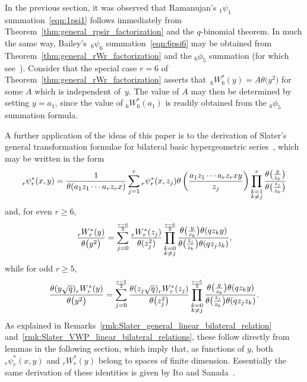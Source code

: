 \documentclass[pdftex]{sigma}
\numberwithin{equation}{section}
\begin{document}
In the previous section, it was observed that Ramanujan's $_1\psi_1$ summation~\eqref{eqn:1psi1} follows immediately from Theorem~\ref{thm:general_rpsir_factorization} and the $q$-binomial theorem. In much the same way, Bailey's~$_6\psi_6$ summation~\eqref{eqn:6psi6} may be obtained from Theorem~\ref{thm:general_rWr_factorization} and the $_6\phi_5$ summation (for which see~\cite[equation~(2.7.1)]{Gasper2004}). Consider that the special case $r=6$ of Theorem~\ref{thm:general_rWr_factorization} asserts that~${_6W_6^\ast(y) = A \theta\bigl(y^2\bigr)}$ for some $A$ which is independent of~$y$. The value of $A$ may then be determined by setting $y=a_1$, since the value of $_6W_6^\ast(a_1)$ is readily obtained from the $_6\phi_5$ summation formula.

A further application of the ideas of this paper is to the derivation of Slater's general transformation formulae for bilateral basic hypergeometric series~\cite{Slater1952}, which may be written in the form
\begin{equation} \label{eqn:Slater_general_linear_bilateral_relation}
_r^{}\psi_r^\ast(x,y) = {1 \over \theta(a_1z_1\cdots a_r z_r x)} \sum_{j=1}^r {}_r^{}\psi_r^\ast(x,z_j) \theta \left({a_1z_1\cdots a_r z_r xy \over z_j} \right) \prod_{\substack{k=1 \\ k \neq j}}^r {\theta\bigl({y \over z_k}\bigr) \over \theta\bigl({z_j \over z_k}\bigr)}
\end{equation}
and, for even $r \geq 6$,
\begin{equation} \label{Slater_VWP_linear_bilateral_relation_even}
{_r^{}W_r^\ast(y) \over \theta\bigl(y^2\bigr)} = \sum_{j=0}^{r-6 \over 2} {_r^{}W_r^\ast(z_j) \over \theta(z_j^2)} \prod_{\substack{k=0 \\ k \neq j}}^{r-6 \over 2} {\theta\bigl({y \over z_k}\bigr) \theta(qz_ky) \over \theta\bigl({z_j \over z_k}\bigr) \theta(qz_jz_k)},
\end{equation}
while for odd $r \geq 5$,
\begin{equation} \label{Slater_VWP_linear_bilateral_relation_odd}
{\theta(y\sqrt{q}) {}_r^{}W_r^\ast(y) \over \theta\bigl(y^2\bigr)} = \sum_{j=0}^{r-5 \over 2} {\theta(z_j\sqrt{q}) {}_r^{}W_r^\ast(z_j) \over \theta\bigl(z_j^2\bigr)} \prod_{\substack{k=0 \\ k \neq j}}^{r-5 \over 2} {\theta\bigl({y \over z_k}\bigr) \theta(qz_ky) \over \theta\bigl({z_j \over z_k}\bigr) \theta(qz_jz_k)}.
\end{equation}
As explained in Remarks~\ref{rmk:Slater_general_linear_bilateral_relation} and~\ref{rmk:Slater_VWP_linear_bilateral_relations}, these follow directly from lemmas in the following section, which imply that, as functions of $y$, both $_r^{}\psi_r^\ast(x,y)$ and $_r^{}W_r^\ast(y)$ belong to spaces of finite dimension. Essentially the same derivation of these identities is given by Ito and Sanada~\cite[Section~3.1]{Ito2008}.
\end{document}

